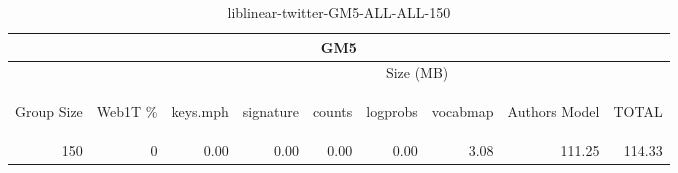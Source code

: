 \begin{center}
\begin{table}[htbp]
\begin{tabular}{ | r | r | r | r | r | r | r | r | r |}
\hline
\multicolumn{9}{|c|}{GM5}\\
\hline
 & & \multicolumn{7}{|c|}{Size (MB)}\\ \cline{3-9}
\begin{sideways}Group Size\end{sideways} & \begin{sideways}Web1T \% \end{sideways} & \begin{sideways}keys.mph\end{sideways} & \begin{sideways}signature\end{sideways} & \begin{sideways}counts\end{sideways} & \begin{sideways}logprobs\end{sideways} & \begin{sideways}vocabmap\end{sideways} & \begin{sideways}Authors Model \end{sideways} & \begin{sideways}TOTAL\end{sideways}\\
\hline
\multirow{0}{*}{150}
 & 0 & 0.00 & 0.00 & 0.00 & 0.00 & 3.08 & 111.25 & 114.33\\ \cline{2-9}
\hline
\end{tabular}
\caption{liblinear-twitter-GM5-ALL-ALL-150}
\label{table:liblinear-twitter-GM5-ALL-ALL-150}
\end{table}
\end{center}

